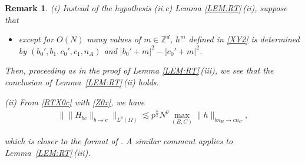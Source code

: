 \documentclass[%
11pt,  reqno]{amsart}
\newtheorem{remark}[theorem]{Remark}
\newcommand{\1}{\hspace{0.2mm}\text{I}\hspace{0.2mm}}
\newcommand{\noi}{\noindent}
\newcommand{\Z}{\mathbb{Z}}
\renewcommand{\O}{\Omega}
\newcommand{\les}{\lesssim}
\numberwithin{equation}{section}
\numberwithin{theorem}{section}
\begin{document}
\begin{remark}
\rm 

(i)
Instead of the hypothesis (ii.c)
Lemma \ref{LEM:RT}\,(ii), 
 suppose that 
\begin{itemize}


\smallskip

\item[(ii.c')] except for  $O(N)$ many values of $m \in \Z^d$, 
$h^m$
defined in  \eqref{XY2}
is determined by $(b_0', b_1, c_0', c_1, n_A)$ and 
$|b_0'+m|^2 - |c_0'+m|^2$.

\smallskip


\end{itemize}


\noi
Then, 
proceeding as in the proof of Lemma \ref{LEM:RT}\,(iii), 
we see that the conclusion of 
Lemma~\ref{LEM:RT}\,(ii) holds. 


\smallskip

\noi
(ii)
From \eqref{RTX0c} with \eqref{Z0x}, 
we have 
\begin{align*}
\big\| \| H_{bc} \|_{b \to c} \big\|_{L^p(\O)} 
\les p^{\frac k2} N^{\theta}
\max_{(B,C)} \| h \|_{b n_B \to c n_C},
\end{align*}


\noi
which is closer to the format of 
\cite[Proposition 4.15]{DNY3}.
%
%
%
A similar comment applies to 
Lemma~\ref{LEM:RT}\,(iii).


\end{remark}
\end{document}
